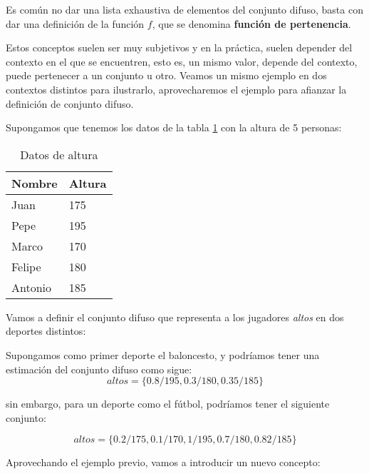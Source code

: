 Es común no dar una lista exhaustiva de elementos del conjunto difuso, basta con dar una definición de la función $f$, que se denomina \textbf{función de pertenencia}.

Estos conceptos suelen ser muy subjetivos y en la práctica, suelen depender del contexto en el que se encuentren, esto es, un mismo valor, depende del contexto, puede pertenecer a un conjunto u otro. Veamos un mismo ejemplo en dos contextos distintos para ilustrarlo, aprovecharemos el ejemplo para afianzar la definición de conjunto difuso.

\begin{example}
Supongamos que tenemos los datos de la tabla \ref{datatable} con la altura de 5 personas:

\begin{table}[h]
\centering
\begin{tabular}{|l|l|}
\hline
\textbf{Nombre} & \textbf{Altura} \\ \hline
Juan            & 175             \\ \hline
Pepe            & 195             \\ \hline
Marco           & 170             \\ \hline
Felipe          & 180             \\ \hline
Antonio         & 185             \\ \hline
\end{tabular}
\caption{Datos de altura}
\label{datatable}
\end{table}

Vamos a definir el conjunto difuso que representa a los jugadores \textit{altos} en dos deportes distintos:

Supongamos como primer deporte el baloncesto, y podríamos tener una estimación del conjunto difuso como sigue:
\begin{equation*}
    altos = \{0.8/195, 0.3/180, 0.35/185\}
\end{equation*}

sin embargo, para un deporte como el fútbol, podríamos tener el siguiente conjunto:

\begin{equation*}
    altos = \{0.2/175, 0.1/170, 1/195, 0.7/180, 0.82/185\}
\end{equation*}

\end{example}

Aprovechando el ejemplo previo, vamos a introducir un nuevo concepto:


